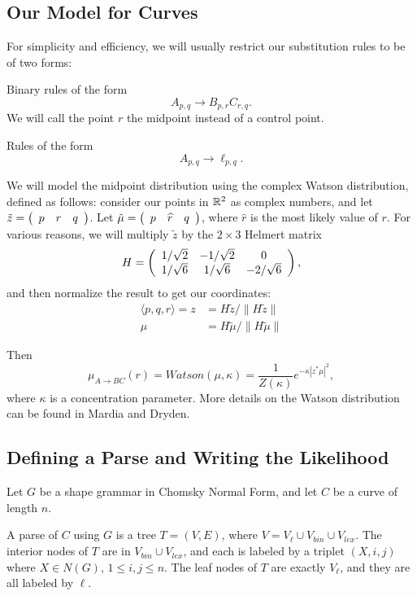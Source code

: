 \documentclass{article}
\begin{document}
\subsection{Our Model for Curves}

For simplicity and efficiency, we will usually restrict our
substitution rules to be of two forms:
\bitem
\item Binary rules of the form $$ A_{p,q} \to B_{p,r} C_{r,q}.$$ We
  will call the point $r$ the midpoint instead of a control point.
\item Rules of the form $$ A_{p,q} \to \ell_{p,q}.$$
\eitem 

We will model the midpoint distribution using the complex Watson
distribution, defined as follows: consider our points in $\mathbb{R}^2$ as
complex numbers, and let $\tilde{z} = \left(\begin{array}{c c c} p& r&
  q\end{array}\right)$.  Let $\tilde{\mu} = \left(\begin{array}{c c c} p&
    \widehat{r} & q\end{array}\right)$, where $\widehat{r}$ is the
    most likely value of $r$. For various reasons, we will multiply
    $\tilde{z}$ by the $2\times 3$ Helmert matrix
$$H = \left(\begin{array}{c c c} 1/\sqrt{2} & -1/\sqrt{2} & 0
  \\ 1/\sqrt{6} & 1/\sqrt{6} & -2/\sqrt{6}\end{array}\right), $$ and
then normalize the result to get our coordinates:
\begin{align*}
\langle p, q, r\rangle = z &= H\tilde{z} / \|H\tilde{z}\| \\
\mu &= H\tilde{\mu} / \|H\tilde{\mu}\|
\end{align*}

Then
$$\mu_{A\to BC}(r) = Watson(\mu,\kappa) =
\frac{1}{Z(\kappa)}e^{-\kappa |z^*\mu|^2},$$ where $\kappa$ is a
concentration parameter. More details on the Watson distribution can
be found in Mardia and Dryden.

\subsection{Defining a Parse and Writing the Likelihood}

Let $G$ be a shape grammar in Chomsky Normal Form, and let
$C$ be a curve of length $n$.

A parse of $C$ using $G$ is a tree $T=(V,E)$, where
$V = V_{\ell} \cup V_{bin} \cup V_{lex}$. The interior
nodes of $T$ are in $V_{bin} \cup V_{lex}$, and each is
labeled by a triplet $(X,i,j)$ where $X\in N(G)$, 
$1\le i,j \le n$. The leaf nodes of $T$ are 
exactly $V_\ell$, and they are all labeled by $\ell$.
\end{document}
